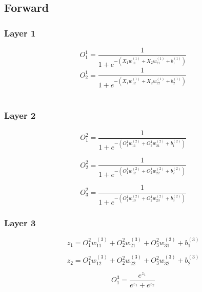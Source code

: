 \documentclass{article}
\begin{document}
\subsection*{Forward}
\subsubsection*{Layer 1}
\begin{equation*}
    O_{1}^{1} = \frac{1}{1 + e^{-(X_{1}w_{11}^{(1)} + X_{2}w_{21}^{(1)} + b_{1}^{(1)})}}
\end{equation*}
\begin{equation*}
    O_{2}^{1} = \frac{1}{1+e^{-(X_{1}w_{12}^{(1)} + X_{2}w_{22}^{(1)} + b_{2}^{(1)})}}
\end{equation*}
\
\subsubsection*{Layer 2}

\begin{equation*}
    O_{1}^{2} = \frac{1}{1 + e^{-(O_{1}^{1}w_{11}^{(2)} + O_{2}^{1}w_{21}^{(2)} + b_{1}^{(2)})}}    
\end{equation*}

\begin{equation*}
    O_{2}^{2} = \frac{1}{1 + e^{-(O_{1}^{1}w_{12}^{(2)} +O_{2}^{1}w_{22}^{(2)}+b_{2}^{(2)})}}
\end{equation*}

\begin{equation*}
    O_{3}^{2} = \frac{1}{
        1 + e^{-(
            O_{1}^{1}w_{13}^{(2)}+
            O_{2}^{1}w_{23}^{(2)}+
            b_{3}^{(2)}
        )}
    }
\end{equation*}

\subsubsection*{Layer 3}
\begin{equation*}
    z_{1} = O_{1}^{2}w_{11}^{(3)} + O_{2}^{2}w_{21}^{(3)} + O_{3}^{2}w_{31}^{(3)} + b_{1}^{(3)}
\end{equation*}

\begin{equation*}
    z_{2} = O_{1}^{2}w_{12}^{(3)} + O_{2}^{2}w_{22}^{(3)} + O_{3}^{2}w_{32}^{(3)} + b_{2}^{(3)}
\end{equation*}

\begin{equation*}
    O_{1}^{3} = \frac{e^{z_{1}}}{e^{z_{1}} + e^{z_{2}}}
\end{equation*}
\end{document}
